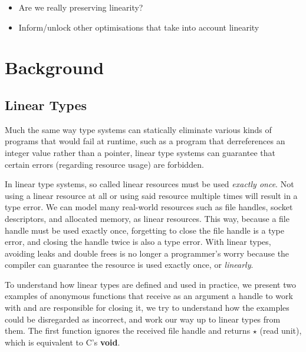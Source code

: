 \documentclass[]{lwnovathesis}
\begin{document}
\begin{itemize}
    \item Are we really preserving linearity?
    \item Inform/unlock other optimisations that take into account linearity
\end{itemize}


\chapter{Background}

\section{Linear Types\label{linear-types}}

Much the same way type systems can statically eliminate various kinds of
programs that would fail at runtime, such as a program that derreferences an
integer value rather than a pointer, linear type systems can guarantee that
certain errors (regarding resource usage) are forbidden.

In linear type systems, so called linear resources must be used \emph{exactly
once}. Not using a linear resource at all or using said resource multiple times
will result in a type error. We can model many real-world resources such as file
handles, socket descriptors, and allocated memory, as linear resources. This
way, because a file handle must be used exactly once, forgetting to close the
file handle is a type error, and closing the handle twice is also a type error.
With linear types, avoiding leaks and double frees is no longer a programmer's
worry because the compiler can guarantee the resource is used exactly once, or
\emph{linearly}.

To understand how linear types are defined and used in practice, we present two
examples of anonymous functions that receive as an argument a handle to work
with and are responsible for closing it, we try to understand how the examples
could be disregarded as incorrect, and work our way up to linear types from
them. The first function ignores the received file handle and returns $\star$
(read unit), which is equivalent to C's \textbf{void}.
\end{document}
